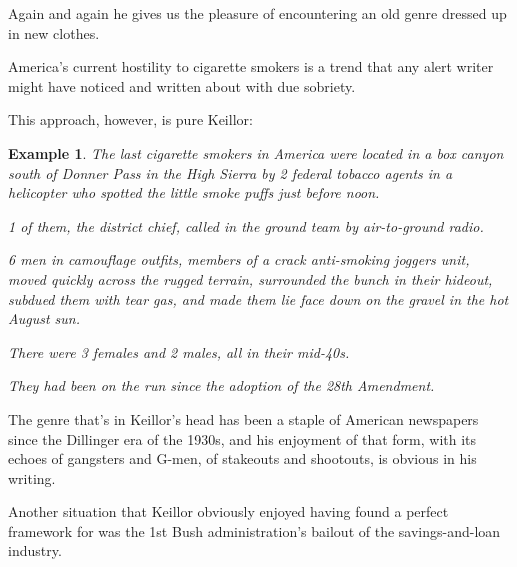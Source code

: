\documentclass{book}
\numberwithin{equation}{section}
\newtheorem{example}{Example}[chapter]
\begin{document}
Again and again he gives us the pleasure of encountering an old genre dressed up in new clothes.

America's current hostility to cigarette smokers is a trend that any alert writer might have noticed and written about with due sobriety.

This approach, however, is pure Keillor:
\begin{example}
    The last cigarette smokers in America were located in a box canyon south of Donner Pass in the High Sierra by 2 federal tobacco agents in a helicopter who spotted the little smoke puffs just before noon.
    
    1 of them, the district chief, called in the ground team by air-to-ground radio.
    
    6 men in camouflage outfits, members of a crack anti-smoking joggers unit, moved quickly across the rugged terrain, surrounded the bunch in their hideout, subdued them with tear gas, and made them lie face down on the gravel in the hot August sun.
    
    There were 3 females and 2 males, all in their mid-40s.
    
    They had been on the run since the adoption of the 28th Amendment.
\end{example}
The genre that's in Keillor's head has been a staple of American newspapers since the Dillinger era of the 1930s, and his enjoyment of that form, with its echoes of gangsters and G-men, of stakeouts and shootouts, is obvious in his writing.

%
Another situation that Keillor obviously enjoyed having found a perfect framework for was the 1st Bush administration's bailout of the savings-and-loan industry.
\end{document}

